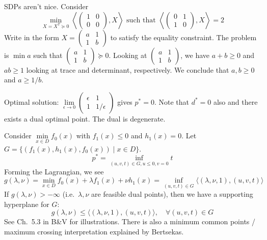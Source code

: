 \begin{rem}
SDPs aren't nice. Consider 
\[
 \min \limits_{X=X^T \succeq 0} \left \langle \begin{pmatrix} 1 & 0 \\ 0 & 0 \end{pmatrix}, X \right \rangle \text{ such that }
\left \langle \begin{pmatrix} 0 & 1 \\ 1 & 0\end{pmatrix}, X \right \rangle =2
\]
Write in the form $X = \begin{pmatrix} a & 1 \\ 1 & b \end{pmatrix}$ to satisfy the equality constraint. The problem is $\min a$ such that $ \begin{pmatrix} a & 1 \\ 1 & b \end{pmatrix} \succeq 0$. Looking at $\begin{pmatrix} a & 1 \\ 1 & b \end{pmatrix}$, we have $a + b \ge 0$ and $ab \ge 1$ looking at trace and determinant, respectively. We conclude that $ a,b \ge 0$ and $a \ge 1/b$.

Optimal solution: $\lim \limits_{\epsilon \to 0} \begin{pmatrix} \epsilon & 1 \\ 1 & 1/\epsilon \end{pmatrix}$ gives $p^*=0$.
Note that $d^*=0$ also and there exists a dual optimal point. The dual is degenerate.
\end{rem}


\begin{rem}
Consider $\min \limits_{x \in D} f_0(x)$ with $f_1(x) \le 0$ and $h_1(x) =0$. Let $G = \{ (f_1(x),h_1(x), f_0(x) ) \mid x \in D \}$.
\[
p^* = \inf \limits_{(u,v,t) \in G, u \le 0, v=0} t
\]
Forming the Lagrangian, we see
\[
g(\lambda,\nu) =  \min \limits_{x \in D}   f_0(x) + \lambda f_1(x) + \nu h_1(x)
= \inf \limits_{(u,v,t) \in G} \langle (\lambda,\nu,1) , (u,v,t) \rangle
\]
If $g(\lambda,\nu) > -\infty$ (i.e.\ $\lambda,\nu$ are feasible dual points), then we have a supporting hyperplane for $G$:
\[
g(\lambda,\nu) \le  \langle (\lambda,\nu,1) , (u,v,t) \rangle, \quad \forall (u,v,t) \in G
\]
See Ch.\ 5.3 in B\&V for illustrations. There is also a minimum common points / maximum crossing interpretation explained by Bertsekas.
\end{rem}

